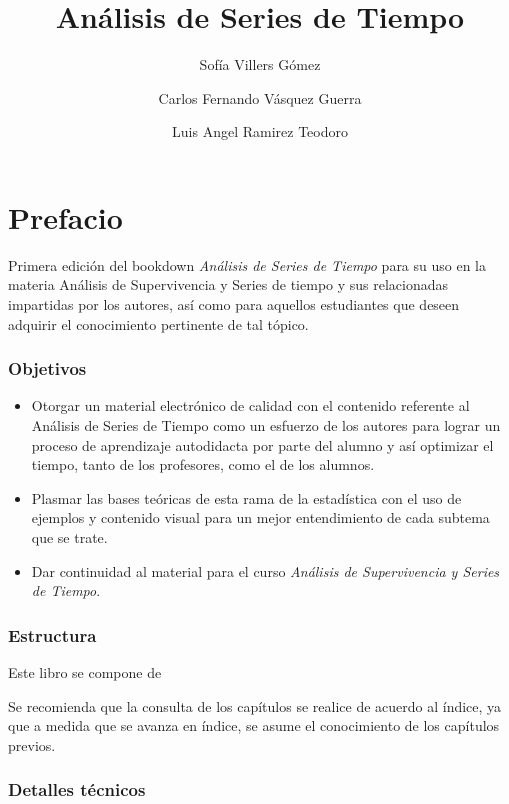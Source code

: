 \documentclass[a4paper,oneside,openany]{book}
\title{Análisis de Series de Tiempo}
\author{Sofía Villers Gómez \and Carlos Fernando Vásquez Guerra \and Luis Angel Ramirez Teodoro}
\date{}
\begin{document}
\maketitle

{
\setcounter{tocdepth}{3}
\tableofcontents
}
\chapter*{Prefacio}\label{prefacio}


Primera edición del bookdown \emph{Análisis de Series de Tiempo} para su
uso en la materia Análisis de Supervivencia y Series de tiempo y sus
relacionadas impartidas por los autores, así como para aquellos
estudiantes que deseen adquirir el conocimiento pertinente de tal
tópico.

\subsection*{Objetivos}\label{objetivos}


\begin{itemize}
\item
  Otorgar un material electrónico de calidad con el contenido referente
  al Análisis de Series de Tiempo como un esfuerzo de los autores para
  lograr un proceso de aprendizaje autodidacta por parte del alumno y
  así optimizar el tiempo, tanto de los profesores, como el de los
  alumnos.
\item
  Plasmar las bases teóricas de esta rama de la estadística con el uso
  de ejemplos y contenido visual para un mejor entendimiento de cada
  subtema que se trate.
\item
  Dar continuidad al material para el curso \emph{Análisis de
  Supervivencia y Series de Tiempo}.
\end{itemize}

\subsection*{Estructura}\label{estructura}


Este libro se compone de

Se recomienda que la consulta de los capítulos se realice de acuerdo al
índice, ya que a medida que se avanza en índice, se asume el
conocimiento de los capítulos previos.

\subsection*{Detalles técnicos}\label{detalles-tuxe9cnicos}
\end{document}
